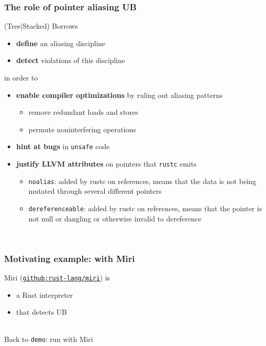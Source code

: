 \begin{frame}
    \frametitle{The role of pointer aliasing UB}
    (Tree|Stacked) Borrows
    \begin{itemize}
        \item \textbf{define} an aliasing discipline
        \item \textbf{detect} violations of this discipline
    \end{itemize}
    in order to
    \begin{itemize}
        \item \textbf{enable compiler optimizations} by ruling out aliasing patterns
            \begin{itemize}
                \item remove redundant loads and stores
                \item permute noninterfering operations
            \end{itemize}
        \item \textbf{hint at bugs} in \texttt{unsafe} code
        \item \textbf{justify LLVM attributes} on pointers that \texttt{rustc} emits
            \begin{itemize}
                \item \texttt{noalias}: added by rustc on references, means that the data
                    is not being mutated through several different pointers
                \item \texttt{dereferenceable}: added by rustc on references, means that
                    the pointer is not null or dangling or otherwise invalid to dereference
            \end{itemize}
    \end{itemize}~\\
\end{frame}

\begin{frame}[fragile]
    \frametitle{Motivating example: with Miri}
    Miri (\href{https://github.com/rust-lang/miri}{\texttt{github:rust-lang/miri}}) is
    \begin{itemize}
        \item a Rust interpreter
        \item that detects UB
    \end{itemize}~\\

    Back to \texttt{demo}: run with Miri
\end{frame}

